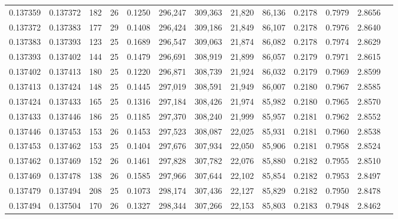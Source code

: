 \begin{tabular}{rrrrrrrrrrrrr}
0.137359 & 0.137372 &   182 &  26 &                                     0.1250 & 296,247 & 309,363 &  21,820 &  86,136 & 0.2178 & 0.7979 & 2.8656 \\
0.137372 & 0.137383 &   177 &  29 &                                     0.1408 & 296,424 & 309,186 &  21,849 &  86,107 & 0.2178 & 0.7976 & 2.8640 \\
0.137383 & 0.137393 &   123 &  25 &                                     0.1689 & 296,547 & 309,063 &  21,874 &  86,082 & 0.2178 & 0.7974 & 2.8629 \\
0.137393 & 0.137402 &   144 &  25 &                                     0.1479 & 296,691 & 308,919 &  21,899 &  86,057 & 0.2179 & 0.7971 & 2.8615 \\
0.137402 & 0.137413 &   180 &  25 &                                     0.1220 & 296,871 & 308,739 &  21,924 &  86,032 & 0.2179 & 0.7969 & 2.8599 \\
0.137413 & 0.137424 &   148 &  25 &                                     0.1445 & 297,019 & 308,591 &  21,949 &  86,007 & 0.2180 & 0.7967 & 2.8585 \\
0.137424 & 0.137433 &   165 &  25 &                                     0.1316 & 297,184 & 308,426 &  21,974 &  85,982 & 0.2180 & 0.7965 & 2.8570 \\
0.137433 & 0.137446 &   186 &  25 &                                     0.1185 & 297,370 & 308,240 &  21,999 &  85,957 & 0.2181 & 0.7962 & 2.8552 \\
0.137446 & 0.137453 &   153 &  26 &                                     0.1453 & 297,523 & 308,087 &  22,025 &  85,931 & 0.2181 & 0.7960 & 2.8538 \\
0.137453 & 0.137462 &   153 &  25 &                                     0.1404 & 297,676 & 307,934 &  22,050 &  85,906 & 0.2181 & 0.7958 & 2.8524 \\
0.137462 & 0.137469 &   152 &  26 &                                     0.1461 & 297,828 & 307,782 &  22,076 &  85,880 & 0.2182 & 0.7955 & 2.8510 \\
0.137469 & 0.137478 &   138 &  26 &                                     0.1585 & 297,966 & 307,644 &  22,102 &  85,854 & 0.2182 & 0.7953 & 2.8497 \\
0.137479 & 0.137494 &   208 &  25 &                                     0.1073 & 298,174 & 307,436 &  22,127 &  85,829 & 0.2182 & 0.7950 & 2.8478 \\
0.137494 & 0.137504 &   170 &  26 &                                     0.1327 & 298,344 & 307,266 &  22,153 &  85,803 & 0.2183 & 0.7948 & 2.8462 \\

\end{tabular}
